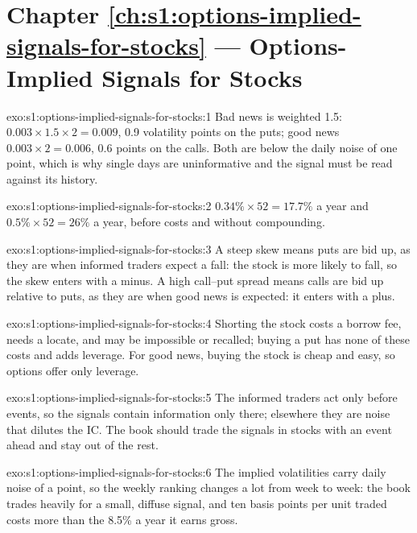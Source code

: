 \section*{Chapter \ref{ch:s1:options-implied-signals-for-stocks} --- Options-Implied Signals for Stocks}

\begin{solution}{exo:s1:options-implied-signals-for-stocks:1}
Bad news is weighted 1.5: $0.003 \times 1.5 \times 2 = 0.009$, 0.9 volatility points on the puts; good news $0.003 \times 2 = 0.006$, 0.6 points on the calls. Both
are below the daily noise of one point, which is why single days are uninformative and the signal must be read against its history.
\end{solution}

\begin{solution}{exo:s1:options-implied-signals-for-stocks:2}
$0.34\% \times 52 = 17.7\%$ a year and $0.5\% \times 52 = 26\%$ a year, before costs and without compounding.
\end{solution}

\begin{solution}{exo:s1:options-implied-signals-for-stocks:3}
A steep skew means puts are bid up, as they are when informed traders expect a fall: the stock is more likely to fall, so the skew enters with a minus. A high
call--put spread means calls are bid up relative to puts, as they are when good news is expected: it enters with a plus.
\end{solution}

\begin{solution}{exo:s1:options-implied-signals-for-stocks:4}
Shorting the stock costs a borrow fee, needs a locate, and may be impossible or recalled; buying a put has none of these costs and adds leverage. For good
news, buying the stock is cheap and easy, so options offer only leverage.
\end{solution}

\begin{solution}{exo:s1:options-implied-signals-for-stocks:5}
The informed traders act only before events, so the signals contain information only there; elsewhere they are noise that dilutes the IC. The book should
trade the signals in stocks with an event ahead and stay out of the rest.
\end{solution}

\begin{solution}{exo:s1:options-implied-signals-for-stocks:6}
The implied volatilities carry daily noise of a point, so the weekly ranking changes a lot from week to week: the book trades heavily for a small, diffuse
signal, and ten basis points per unit traded costs more than the 8.5\% a year it earns gross.
\end{solution}

